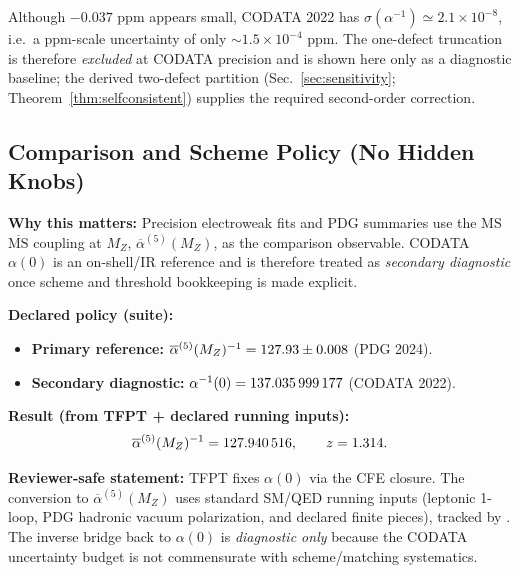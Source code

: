 Although $-0.037$ ppm appears small, CODATA 2022 has $\sigma(\alpha^{-1})\simeq 2.1\times 10^{-8}$, i.e.\ a ppm-scale uncertainty of only $\sim 1.5\times 10^{-4}$ ppm. The one-defect truncation is therefore \emph{excluded} at CODATA precision and is shown here only as a diagnostic baseline; the derived two-defect partition (Sec.~\ref{sec:sensitivity}; Theorem~\ref{thm:selfconsistent}) supplies the required second-order correction.

\TFPTAlphaSensitivityPlot

\subsection{Comparison and Scheme Policy (No Hidden Knobs)}
\label{sec:comparison-policy}

\begin{tcolorbox}[colback=yellow!3, colframe=yellow!60!black,
    title={\textbf{Primary comparison observable: $\overline{\alpha}^{(5)}(M_Z)$ (MS$\overline{\mathrm{MS}}$)}}, fonttitle=\bfseries\small]
\textbf{Why this matters:} Precision electroweak fits and PDG summaries use the MS$\overline{\mathrm{MS}}$ coupling at $M_Z$, $\overline{\alpha}^{(5)}(M_Z)$, as the comparison observable. CODATA $\alpha(0)$ is an on-shell/IR reference and is therefore treated as \emph{secondary diagnostic} once scheme and threshold bookkeeping is made explicit.

\textbf{Declared policy (suite):}
\begin{itemize}[leftmargin=1.5em, topsep=2pt, itemsep=1pt]
    \item \textbf{Primary reference:} $\overline{\alpha}^{(5)}(M_Z)^{-1} = \num{127.93} \pm \num{0.008}$ (PDG 2024).
    \item \textbf{Secondary diagnostic:} $\alpha^{-1}(0)=\num{137.035999177}$ (CODATA 2022).
\end{itemize}

\textbf{Result (from TFPT + declared running inputs):}
\[
\overline{\alpha}^{(5)}(M_Z)^{-1}=\num[round-mode=places,round-precision=6]{\TFPTalphaBarFiveInvMZPredNum},
\qquad
z=\num[round-mode=places,round-precision=3]{\TFPTalphaBarFiveInvMZZ}.
\]

\textbf{Reviewer-safe statement:} TFPT fixes $\alpha(0)$ via the CFE closure. The conversion to $\overline{\alpha}^{(5)}(M_Z)$ uses standard SM/QED running inputs (leptonic 1-loop, PDG hadronic vacuum polarization, and declared finite pieces), tracked by . The inverse bridge back to $\alpha(0)$ is \emph{diagnostic only} because the CODATA uncertainty budget is not commensurate with scheme/matching systematics.
\end{tcolorbox}

